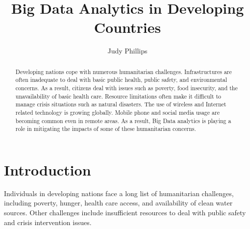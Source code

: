 \documentclass[sigconf]{acmart}
\begin{document}
\title{Big Data Analytics in Developing Countries}


\author{Judy Phillips}

\renewcommand{\shortauthors}{B. Trovato et al.}


\begin{abstract}
Developing nations cope with numerous humanitarian challenges. Infrastructures are often inadequate to deal with basic public health, public safety, and environmental concerns. As a result, citizens deal with issues such as poverty, food insecurity, and the unavailability of basic health care. Resource limitations often make it difficult to manage crisis situations such as natural disasters. The use of wireless and Internet related technology is growing globally. Mobile phone and social media usage are becoming common even in remote areas. As a result, Big Data analytics is playing a role in mitigating the impacts of some of these humanitarian concerns. 
\end{abstract}



\maketitle

\section{Introduction}

Individuals in developing nations face a long list of humanitarian challenges, including poverty, hunger, health care access, and availability of clean water sources. Other challenges include insufficient resources to deal with public safety and crisis intervention issues.
\end{document}

